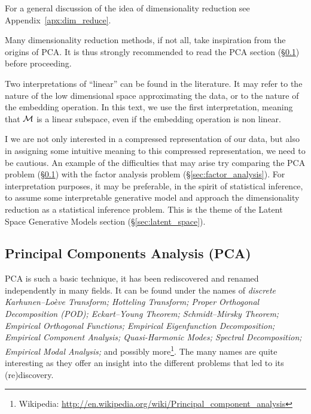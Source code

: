 For a general discussion of the idea of dimensionality reduction see Appendix~\ref{apx:dim_reduce}.

Many dimensionality reduction methods, if not all, take inspiration from the origins of PCA. 
It is thus strongly recommended to read the PCA section (\S\ref{sec:pca}) before proceeding.

\begin{remark}
\label{remark:linear}
	Two interpretations of ``linear'' can be found in the literature. It may refer to the nature of the low dimensional space approximating the data, or to the nature of the embedding operation. In this text, we use the first interpretation, meaning that $\mathcal{M}$ is a linear subspace, even if the embedding operation is non linear.
\end{remark}


\begin{remark}
I we are not only interested in a compressed representation of our data, but also in assigning some intuitive meaning to this compressed representation, we need to be cautious. 
An example of the difficulties that may arise try comparing the PCA problem (\S\ref{sec:pca}) with the factor analysis problem (\S\ref{sec:factor_analysis}).
For interpretation purposes, it may be preferable, in the spirit of statistical inference, to assume some interpretable generative model and approach the dimensionality reduction as a statistical inference problem.
This is the theme of the Latent Space Generative Models section (\S\ref{sec:latent_space}).
\end{remark}




\subsection{Principal Components Analysis (PCA)}
\label{sec:pca}


PCA is such a basic technique, it has been rediscovered and renamed independently in many fields. 
It can be found under the names of \emph{discrete Karhunen–Loève Transform; Hotteling Transform; Proper Orthogonal Decomposition (POD); Eckart–Young Theorem; Schmidt–Mirsky Theorem;  Empirical Orthogonal Functions; Empirical Eigenfunction Decomposition;  Empirical Component Analysis;  Quasi-Harmonic Modes;  Spectral Decomposition;  Empirical Modal Analysis;} and possibly more\footnote{Wikipedia: \url{http://en.wikipedia.org/wiki/Principal_component_analysis} }.
The many names are quite interesting as they offer an insight into the different problems that led to its (re)discovery.

